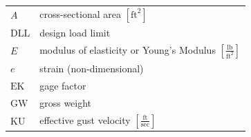 \documentclass[
]{book}
\begin{document}
\begin{longtable}[]{@{}ll@{}}
\toprule
\endhead
\begin{minipage}[t]{0.14\columnwidth}\raggedright
\(A\)\strut
\end{minipage} & \begin{minipage}[t]{0.80\columnwidth}\raggedright
cross-sectional area \(\left[\text{ft}^2\right]\)\strut
\end{minipage}\tabularnewline
\begin{minipage}[t]{0.14\columnwidth}\raggedright
\(\mathrm{DLL}\)\strut
\end{minipage} & \begin{minipage}[t]{0.80\columnwidth}\raggedright
design load limit\strut
\end{minipage}\tabularnewline
\begin{minipage}[t]{0.14\columnwidth}\raggedright
\(E\)\strut
\end{minipage} & \begin{minipage}[t]{0.80\columnwidth}\raggedright
modulus of elasticity or Young's Modulus \(\left[\frac{\text{lb}}{\text{ft}^2}\right]\)\strut
\end{minipage}\tabularnewline
\begin{minipage}[t]{0.14\columnwidth}\raggedright
\(e\)\strut
\end{minipage} & \begin{minipage}[t]{0.80\columnwidth}\raggedright
strain (non-dimensional)\strut
\end{minipage}\tabularnewline
\begin{minipage}[t]{0.14\columnwidth}\raggedright
\(\mathrm{EK}\)\strut
\end{minipage} & \begin{minipage}[t]{0.80\columnwidth}\raggedright
gage factor\strut
\end{minipage}\tabularnewline
\begin{minipage}[t]{0.14\columnwidth}\raggedright
\(\mathrm{GW}\)\strut
\end{minipage} & \begin{minipage}[t]{0.80\columnwidth}\raggedright
gross weight\strut
\end{minipage}\tabularnewline
\begin{minipage}[t]{0.14\columnwidth}\raggedright
\(\mathrm{KU}\)\strut
\end{minipage} & \begin{minipage}[t]{0.80\columnwidth}\raggedright
effective gust velocity \(\left[\frac{\text{ft}}{\text{sec}}\right]\)\strut

\end{minipage}
\end{longtable}
\end{document}
